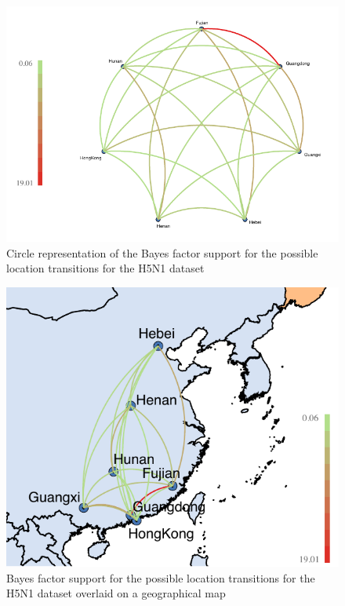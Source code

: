 \documentclass[english]{paper}
\begin{document}
\begin{figure}%
\centering
\includegraphics[width=1\textwidth]{./figures/bf_circle_final.pdf} %
\caption{Circle representation of the Bayes factor support for the possible location transitions for the H5N1 dataset}
\label{fig:BFcircle}
\end{figure}

\begin{figure}%
\centering
\includegraphics[width=1\textwidth]{./figures/bf_map_final.pdf} %
\caption{Bayes factor support for the possible location transitions for the H5N1 dataset overlaid on a geographical map}
\label{fig:BFmap}
\end{figure}
\end{document}
